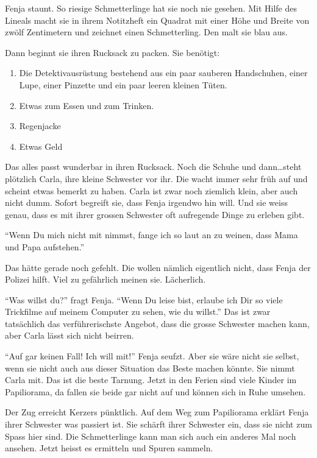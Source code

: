 Fenja staunt. So riesige Schmetterlinge hat sie noch nie gesehen. Mit Hilfe des Lineals macht sie in ihrem Notitzheft ein Quadrat mit einer Höhe und Breite von zwölf Zentimetern und zeichnet einen Schmetterling. Den malt sie blau aus. 

Dann beginnt sie ihren Rucksack zu packen. Sie benötigt:

\begin{enumerate}
  \item Die Detektivausrüstung bestehend aus ein paar sauberen Handschuhen, einer Lupe, einer Pinzette und ein paar leeren kleinen Tüten.
  \item Etwas zum Essen und zum Trinken.
  \item Regenjacke
  \item Etwas Geld
\end{enumerate}

Das alles passt wunderbar in ihren Rucksack. Noch die Schuhe und dann\dots steht plötzlich Carla, ihre kleine Schwester vor ihr. Die wacht immer sehr früh auf und scheint etwas bemerkt zu haben. Carla ist zwar noch ziemlich klein, aber auch nicht dumm. Sofort begreift sie, dass Fenja irgendwo hin will. Und sie weiss genau, dass es mit ihrer grossen Schwester oft aufregende Dinge zu erleben gibt.

\enquote{Wenn Du mich nicht mit nimmst, fange ich so laut an zu weinen, dass Mama und Papa aufstehen.}

Das hätte gerade noch gefehlt. Die wollen nämlich eigentlich nicht, dass Fenja der Polizei hilft. Viel zu gefährlich meinen sie. Lächerlich. 

\enquote{Was willst du?} fragt Fenja. \enquote{Wenn Du leise bist, erlaube ich Dir so viele Trickfilme auf meinem Computer zu sehen, wie du willst.} Das ist zwar tatsächlich das verführerischste Angebot, dass die grosse Schwester machen kann, aber Carla lässt sich nicht beirren.

\enquote{Auf gar keinen Fall! Ich will mit!} Fenja seufzt. Aber sie wäre nicht sie selbst, wenn sie nicht auch aus dieser Situation das Beste machen könnte. Sie nimmt Carla mit. Das ist die beste Tarnung. Jetzt in den Ferien sind viele Kinder im Papiliorama, da fallen sie beide gar nicht auf und können sich in Ruhe umsehen.

Der Zug erreicht Kerzers pünktlich. Auf dem Weg zum Papiliorama erklärt Fenja ihrer Schwester was passiert ist. Sie schärft ihrer Schwester ein, dass sie nicht zum Spass hier sind. Die Schmetterlinge kann man sich auch ein anderes Mal noch ansehen. Jetzt heisst es ermitteln und Spuren sammeln.

